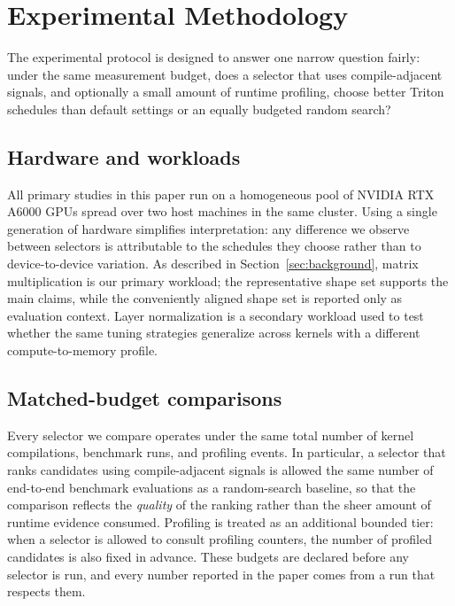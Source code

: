 \section{Experimental Methodology}
\label{sec:methodology}

The experimental protocol is designed to answer one narrow question fairly: under the same measurement budget, does a selector that uses compile-adjacent signals, and optionally a small amount of runtime profiling, choose better Triton schedules than default settings or an equally budgeted random search?

\subsection{Hardware and workloads}

All primary studies in this paper run on a homogeneous pool of NVIDIA RTX A6000 GPUs spread over two host machines in the same cluster. Using a single generation of hardware simplifies interpretation: any difference we observe between selectors is attributable to the schedules they choose rather than to device-to-device variation. As described in Section~\ref{sec:background}, matrix multiplication is our primary workload; the representative shape set supports the main claims, while the conveniently aligned shape set is reported only as evaluation context. Layer normalization is a secondary workload used to test whether the same tuning strategies generalize across kernels with a different compute-to-memory profile.

\subsection{Matched-budget comparisons}

Every selector we compare operates under the same total number of kernel compilations, benchmark runs, and profiling events. In particular, a selector that ranks candidates using compile-adjacent signals is allowed the same number of end-to-end benchmark evaluations as a random-search baseline, so that the comparison reflects the \emph{quality} of the ranking rather than the sheer amount of runtime evidence consumed. Profiling is treated as an additional bounded tier: when a selector is allowed to consult profiling counters, the number of profiled candidates is also fixed in advance. These budgets are declared before any selector is run, and every number reported in the paper comes from a run that respects them.

